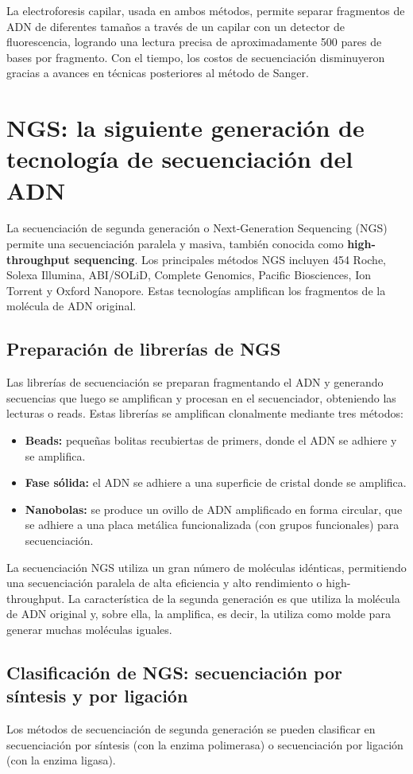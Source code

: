 La electroforesis capilar, usada en ambos métodos, permite separar fragmentos de ADN de diferentes tamaños a través de un capilar con un detector de fluorescencia, logrando una lectura precisa de aproximadamente 500 pares de bases por fragmento. Con el tiempo, los costos de secuenciación disminuyeron gracias a avances en técnicas posteriores al método de Sanger.

\section{NGS: la siguiente generación de tecnología de secuenciación del ADN}
La secuenciación de segunda generación o Next-Generation Sequencing (NGS) permite una secuenciación paralela y masiva, también conocida como \textbf{high-throughput sequencing}. Los principales métodos NGS incluyen 454 Roche, Solexa Illumina, ABI/SOLiD, Complete Genomics, Pacific Biosciences, Ion Torrent y Oxford Nanopore. Estas tecnologías amplifican los fragmentos de la molécula de ADN original. 

\subsection{Preparación de librerías de NGS}
Las librerías de secuenciación se preparan fragmentando el ADN y generando secuencias que luego se amplifican y procesan en el secuenciador, obteniendo las lecturas o reads. Estas librerías se amplifican clonalmente mediante tres métodos:
\begin{itemize}
\item \textbf{Beads:} pequeñas bolitas recubiertas de primers, donde el ADN se adhiere y se amplifica.
\item \textbf{Fase sólida:} el ADN se adhiere a una superficie de cristal donde se amplifica.
\item \textbf{Nanobolas:} se produce un ovillo de ADN amplificado en forma circular, que se adhiere a una placa metálica funcionalizada (con grupos funcionales) para secuenciación.
\end{itemize}

La secuenciación NGS utiliza un gran número de moléculas idénticas, permitiendo una secuenciación paralela de alta eficiencia y alto rendimiento o high-throughput. La característica de la segunda generación es que utiliza la molécula de ADN original y, sobre ella, la amplifica, es decir, la utiliza como molde para generar muchas moléculas iguales. 

\subsection{Clasificación de NGS: secuenciación por síntesis y por ligación}
Los métodos de secuenciación de segunda generación se pueden clasificar en secuenciación por síntesis (con la enzima polimerasa) o secuenciación por ligación (con la enzima ligasa).

